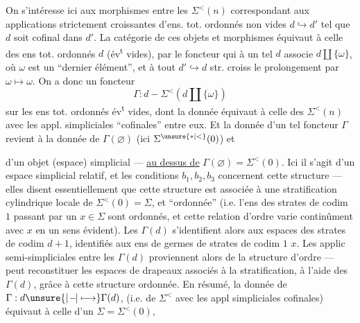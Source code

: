 On s'intéresse ici aux morphismes entre les $\Sigma^{<}(n)$ correspondant aux applications strictement croissantes d'ens. tot. ordonnés non vides $d\hookrightarrow d'$ tel que $d$ soit cofinal dans $d'$. La catégorie de ces objets et morphismes équivaut à celle des ens tot. ordonnés $d$ (év\textsuperscript{t} vides), par le foncteur qui à un tel $d$ associe $d\coprod\{\omega\}$, où $\omega$ est un ``dernier élément'', et à tout $d'\hookrightarrow d$ str. croiss le prolongement par $\omega\mapsto\omega$. On a donc \deleted{\unsure{$\Sigma$}} un foncteur
\[
\Gamma:d-\Sigma^{<}(d\coprod\{\omega\})
\]
sur les ens tot. ordonnés év\textsuperscript{t} vides, dont la donnée équivaut  à celle des $\Sigma^{<}(n)$ avec les appl. simpliciales ``cofinales'' entre eux. Et la donnée d'un  tel foncteur $\Gamma$ revient à la donnée de $\Gamma(\varnothing)$ (ici $\Sigma^{\unsure{*|<}}(0)$) et

d'un objet (espace) simplicial --- \uline{au dessus de}
$\Gamma(\varnothing)=\Sigma^{<}(0)$. Ici il s'agit d'un espace
simplicial relatif, et les conditions $b_1,b_2,b_3$
concernent cette structure --- elles disent
essentiellement que cette structure est associée
à une stratification cylindrique locale de
$\Sigma^{<}(0)=\Sigma$, et ``ordonnée'' (i.e. l'ens des
strates de codim $1$ passant par un $x\in\Sigma$ sont
 ordonnés, et cette relation d'ordre varie
continûment avec $x$ en un sens évident).
Les  $\Gamma(d)$ s'identifient alors
aux  espaces des  strates de codim
$d+1$,   identifiés  aux ens de germes de strates
de codim $1$   $x$. Les applic
semi-simpliciales entre les $\Gamma(d)$ proviennent
alors de la structure d'ordre --- 
peut reconstituer les espaces de drapeaux
associés à la stratification, à l'aide des
 $\Gamma(d)$, grâce à cette structure ordonnée.
En résumé, la donnée de $\Gamma:d\unsure{\mid\! -\!|\longmapsto}\Gamma(d)$,
 (i.e. de $\Sigma^{<}$ avec les appl  simpliciales
cofinales) équivaut à celle d'un $\Sigma=\Sigma^{<}(0)$,


